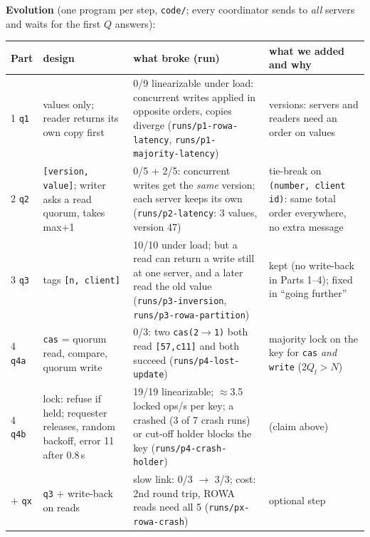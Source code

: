 \documentclass[a4paper,10pt]{article}
\newcommand{\run}[1]{\texttt{runs/#1}}
\begin{document}
\noindent\textbf{Evolution} (one program per step, \texttt{code/}; every
coordinator sends to \emph{all} servers and waits for the first $Q$ answers):
\vspace{-0.3em}
\begin{center}\footnotesize
\begin{tabular}{@{}p{1.0cm}p{3.8cm}p{5.6cm}p{5.1cm}@{}}
\toprule
Part & design & what broke (run) & what we added and why \\
\midrule
1 \texttt{q1} & values only; reader returns its own copy first & 0/9 linearizable under load: concurrent writes applied in opposite orders, copies diverge (\run{p1-rowa-latency}, \run{p1-majority-latency}) & versions: servers and readers need an order on values \\
2 \texttt{q2} & \texttt{[version, value]}; writer asks a read quorum, takes max+1 & 0/5 + 2/5: concurrent writes get the \emph{same} version; each server keeps its own (\run{p2-latency}: 3 values, version 47) & tie-break on \texttt{(number, client id)}: same total order everywhere, no extra message \\
3 \texttt{q3} & tags \texttt{[n, client]} & 10/10 under load; but a read can return a write still at one server, and a later read the old value (\run{p3-inversion}, \run{p3-rowa-partition}) & kept (no write-back in Parts 1--4); fixed in ``going further'' \\
4 \texttt{q4a} & \texttt{cas} = quorum read, compare, quorum write & 0/3: two \texttt{cas(2$\to$1)} both read \texttt{[57,c11]} and both succeed (\run{p4-lost-update}) & majority lock on the key for \texttt{cas} \emph{and} \texttt{write} (2$Q_l>N$) \\
4 \texttt{q4b} & lock: refuse if held; requester releases, random backoff, error 11 after 0.8\,s & 19/19 linearizable; $\approx$3.5 locked ops/s per key; a crashed (3 of 7 crash runs) or cut-off holder blocks the key (\run{p4-crash-holder}) & (claim above) \\
+ \texttt{qx} & \texttt{q3} + write-back on reads & slow link: 0/3 $\to$ 3/3; cost: 2nd round trip, ROWA reads need all 5 (\run{px-rowa-crash}) & optional step \\
\bottomrule
\end{tabular}
\end{center}
\end{document}
